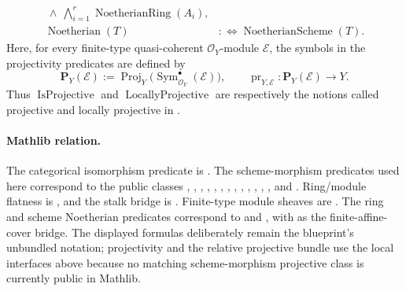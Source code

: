 \begin{definition}
\[\begin{aligned}
        \ \wedge\
        \bigwedge_{i=1}^r\operatorname{NoetherianRing}(A_i),\\
    \operatorname{Noetherian}(T)
      &:\Longleftrightarrow\operatorname{NoetherianScheme}(T).
  \end{aligned}                                                     \tag{P2}
  \]
  Here, for every finite-type quasi-coherent $\mathcal O_Y$-module
  $\mathcal E$, the symbols in the projectivity predicates are defined by
  \[
    \mathbf P_Y(\mathcal E)
      :=\operatorname{Proj}_Y
        \bigl(\operatorname{Sym}_{\mathcal O_Y}^{\bullet}(\mathcal E)\bigr),
    \qquad
    \operatorname{pr}_{Y,\mathcal E}\colon
      \mathbf P_Y(\mathcal E)\longrightarrow Y.                    \tag{P3}
  \]
  Thus $\operatorname{IsProjective}$ and
  $\operatorname{LocallyProjective}$ are respectively the notions called
  projective and locally projective in
  \cite[\href{https://stacks.math.columbia.edu/tag/01W8}{Tag 01W8}]
  {stacks-project}.

  \paragraph{Mathlib relation.}
  The categorical isomorphism predicate is
  \texttt{}.  The scheme-morphism
  predicates used here correspond to the public classes
  \texttt{},
  \texttt{},
  \texttt{},
  \texttt{},
  \texttt{},
  \texttt{},
  \texttt{},
  \texttt{},
  \texttt{},
  \texttt{},
  \texttt{},
  \texttt{},
  \texttt{}, and
  \texttt{}.  Ring/module flatness is
  \texttt{}, and the stalk bridge is
  \texttt{}.
  Finite-type module sheaves
  are \texttt{}.  The ring and
  scheme Noetherian predicates correspond to
  \texttt{} and
  \texttt{}, with
  \texttt{}
  as the
  finite-affine-cover bridge.  The displayed formulas deliberately remain
  the blueprint's unbundled notation; projectivity and the relative
  projective bundle use the local interfaces above because no matching
  scheme-morphism projective class is currently public in Mathlib.
\end{definition}

